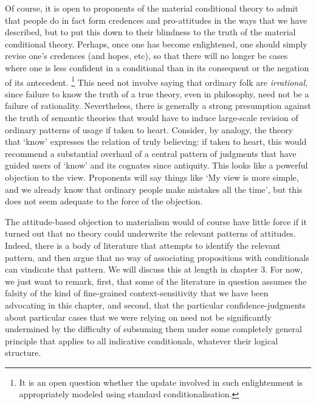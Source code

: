 \documentclass[If.tex]{subfiles}
\begin{document}
Of course, it is open to proponents of the material conditional theory to admit that people do in fact form credences and pro-attitudes in the ways that we have described, but to put this down to their blindness to the truth of the material conditional theory.  Perhaps, once one has become enlightened, one should simply revise one's credences (and hopes, etc), so that there will no longer be cases where one is less confident in a conditional than in its consequent or the negation of its antecedent.%
\footnote{It is an open question whether the update involved in such enlightenment is appropriately modeled using standard conditionalisation.}  
This need not involve saying that ordinary folk are \emph{irrational}, since failure to know the truth of a true theory, even in philosophy, need not be a failure of rationality.  Nevertheless, there is generally a strong presumption against the truth of semantic theories that would have to induce large-scale revision of ordinary patterns of usage if taken to heart.  Consider, by analogy, the theory that ‘know’ expresses the relation of truly believing: if taken to heart, this would recommend a substantial overhaul of a central pattern of judgments that have guided users of ‘know’ and its cognates since antiquity.  This looks like a powerful objection to the view.  Proponents will say things like ‘My view is more simple, and we already know that ordinary people make mistakes all the time’, but this does not seem adequate to the force of the objection.

The attitude-based objection to materialism would of course have little force if it turned out that no theory could underwrite the relevant patterns of attitudes. Indeed, there is a body of literature that attempts to identify the relevant pattern, and then argue that no way of associating propositions with conditionals can vindicate that pattern.  We will discuss this at length in chapter 3.  For now, we just want to remark, first, that some of the literature in question assumes the falsity of the kind of fine-grained context-sensitivity that we have been advocating in this chapter, and second, that the particular confidence-judgments about particular cases that we were relying on need not be significantly undermined by the difficulty of subsuming them under some completely general principle that applies to all indicative conditionals, whatever their logical structure.  


\end{document}
